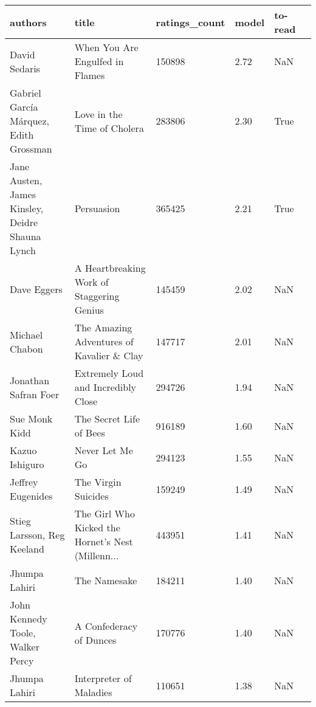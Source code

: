 \begin{tabular}{p{4cm}p{5cm}llll}
\toprule
                                         authors &                                              title &  ratings\_count &  model & to-read \\
\midrule
                                   David Sedaris &                    When You Are Engulfed in Flames &         150898 &   2.72 &     NaN \\
          Gabriel García Márquez, Edith Grossman &                        Love in the Time of Cholera &         283806 &   2.30 &    True \\
 Jane Austen, James Kinsley, Deidre Shauna Lynch &                                         Persuasion &         365425 &   2.21 &    True \\
                                     Dave Eggers &          A Heartbreaking Work of Staggering Genius &         145459 &   2.02 &     NaN \\
                                  Michael Chabon &          The Amazing Adventures of Kavalier \& Clay &         147717 &   2.01 &     NaN \\
                            Jonathan Safran Foer &                Extremely Loud and Incredibly Close &         294726 &   1.94 &     NaN \\
                                   Sue Monk Kidd &                            The Secret Life of Bees &         916189 &   1.60 &     NaN \\
                                  Kazuo Ishiguro &                                    Never Let Me Go &         294123 &   1.55 &     NaN \\
                               Jeffrey Eugenides &                                The Virgin Suicides &         159249 &   1.49 &     NaN \\
                      Stieg Larsson, Reg Keeland &  The Girl Who Kicked the Hornet's Nest (Millenn... &         443951 &   1.41 &     NaN \\
                                   Jhumpa Lahiri &                                       The Namesake &         184211 &   1.40 &     NaN \\
                John Kennedy Toole, Walker Percy &                            A Confederacy of Dunces &         170776 &   1.40 &     NaN \\
                                   Jhumpa Lahiri &                            Interpreter of Maladies &         110651 &   1.38 &     NaN \\

\end{tabular}
